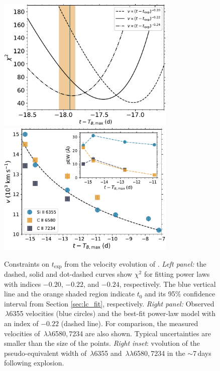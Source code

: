\documentclass[twocolumn]{aastex61}
\begin{document}
\begin{figure}[!thb]
  \centering
  \includegraphics[width=3.35in]{Chi2.pdf}
  \includegraphics[width=3.35in]{VelocityPlot.pdf}
  \caption{ Constraints on $t_\mathrm{exp}$ from the velocity evolution of
  . \textit{Left panel:} the dashed, solid and dot-dashed curves
  show $\chi^2$ for fitting power laws with indices $-0.20$, $-0.22$, and
  $-0.24$, respectively. The blue vertical line and the orange shaded region
  indicate $t_0$ and its 95\% confidence interval from Section
  \ref{sec:lc_fit}, respectively. \textit{Right panel:} Observed
  \,$\lambda$6355 velocities (blue circles) and the best-fit
  power-law model with an index of $-0.22$ (dashed line). For comparison,
  the measured velocities of \,$\lambda\lambda$6580,\,7234 are also
  shown. Typical uncertainties are smaller than the size of the points.
  \textit{Right inset}: vvolution of the pseudo-equivalent width of
  \,$\lambda$6355 and \,$\lambda\lambda$6580,\,7234 in
  the $\sim$7\,days following explosion.}
  \label{fig:velocity_t_exp}
\end{figure}
\end{document}
